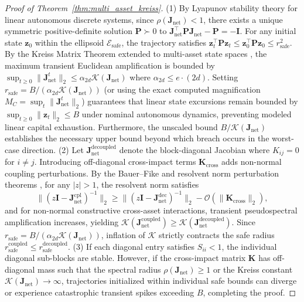 \documentclass[10pt,twocolumn,letterpaper]{article}
\theoremstyle{definition}
\theoremstyle{remark}
\begin{document}
\begin{proof}[Proof of Theorem~\ref{thm:multi_asset_kreiss}]
(1) By Lyapunov stability theory for linear autonomous discrete systems, since $\rho(\mathbf{J}_{\text{net}}) < 1$, there exists a unique symmetric positive-definite solution $\mathbf{P} \succ 0$ to $\mathbf{J}_{\text{net}}^\top \mathbf{P} \mathbf{J}_{\text{net}} - \mathbf{P} = -\mathbf{I}$. For any initial state $\mathbf{z}_0$ within the ellipsoid $\mathcal{E}_{\text{safe}}$, the trajectory satisfies $\mathbf{z}_t^\top \mathbf{P} \mathbf{z}_t \le \mathbf{z}_0^\top \mathbf{P} \mathbf{z}_0 \le r_{\text{safe}}^2$. By the Kreiss Matrix Theorem extended to multi-asset state spaces \citep{trefethen2005spectra,spijker1991}, the maximum transient Euclidean amplification is bounded by $\sup_{t \ge 0} \|\mathbf{J}_{\text{net}}^t\|_2 \le \alpha_{2d} \mathcal{K}(\mathbf{J}_{\text{net}})$ where $\alpha_{2d} \le e \cdot (2d)$. Setting $r_{\text{safe}} = B / (\alpha_{2d} \mathcal{K}(\mathbf{J}_{\text{net}}))$ (or using the exact computed magnification $M_C = \sup_t \|\mathbf{J}_{\text{net}}^t\|_2$) guarantees that linear state excursions remain bounded by $\sup_{t \ge 0} \|\mathbf{z}_t\|_2 \le B$ under nominal autonomous dynamics, preventing modeled linear capital exhaustion. Furthermore, the unscaled bound $B / \mathcal{K}(\mathbf{J}_{\text{net}})$ establishes the necessary upper bound beyond which breach occurs in the worst-case direction.
(2) Let $\mathbf{J}_{\text{net}}^{\text{decoupled}}$ denote the block-diagonal Jacobian where $K_{ij} = 0$ for $i \ne j$. Introducing off-diagonal cross-impact terms $\mathbf{K}_{\text{cross}}$ adds non-normal coupling perturbations. By the Bauer--Fike and resolvent norm perturbation theorems \citep{bhatia2013matrix}, for any $|z| > 1$, the resolvent norm satisfies
\[
\|(z\mathbf{I} - \mathbf{J}_{\text{net}}^{\mathrm{cpl}})^{-1}\|_2 \ge \|(z\mathbf{I} - \mathbf{J}_{\text{net}}^{\mathrm{dec}})^{-1}\|_2 - \mathcal{O}(\|\mathbf{K}_{\text{cross}}\|_2),
\]
and for non-normal constructive cross-asset interactions, transient pseudospectral amplification increases, yielding $\mathcal{K}(\mathbf{J}_{\text{net}}^{\text{coupled}}) \ge \mathcal{K}(\mathbf{J}_{\text{net}}^{\text{decoupled}})$. Since $r_{\text{safe}} = B / (\alpha_{2d} \mathcal{K}(\mathbf{J}_{\text{net}}))$, inflation of $\mathcal{K}$ strictly contracts the safe radius $r_{\text{safe}}^{\text{coupled}} \le r_{\text{safe}}^{\text{decoupled}}$.
(3) If each diagonal entry satisfies $S_{ii} < 1$, the individual diagonal sub-blocks are stable. However, if the cross-impact matrix $\mathbf{K}$ has off-diagonal mass such that the spectral radius $\rho(\mathbf{J}_{\text{net}}) \ge 1$ or the Kreiss constant $\mathcal{K}(\mathbf{J}_{\text{net}}) \to \infty$, trajectories initialized within individual safe bounds can diverge or experience catastrophic transient spikes exceeding $B$, completing the proof.
\end{proof}
\end{document}
